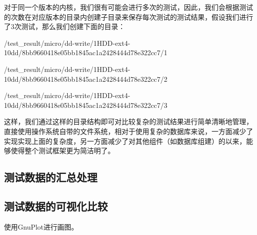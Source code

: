 对于同一个版本的内核，我们很有可能会进行多次的测试，因此，我们会根据测试的次数在对应版本的目录内创建子目录来保存每次测试的测试结果，假设我们进行了3次测试，那么我们创建下面的目录：

\begin{center}
\footnotesize
/test\_result/micro/dd-write/1HDD-ext4-10dd/8bb9660418e05bb1845ac1a2428444d78e322cc7/1

/test\_result/micro/dd-write/1HDD-ext4-10dd/8bb9660418e05bb1845ac1a2428444d78e322cc7/2

/test\_result/micro/dd-write/1HDD-ext4-10dd/8bb9660418e05bb1845ac1a2428444d78e322cc7/3
\end{center}

这样，我们通过这样的目录结构即可对比较复杂的测试结果进行简单清晰地管理，直接使用操作系统自带的文件系统，相对于使用复杂的数据库来说，一方面减少了实现实现上面的复杂度，另一方面减少了对其他组件（如数据库组建）的以来，能够使得整个测试框架更为简洁明了。

\subsection{测试数据的汇总处理}

\subsection{测试数据的可视化比较}

使用GnuPlot进行画图。
